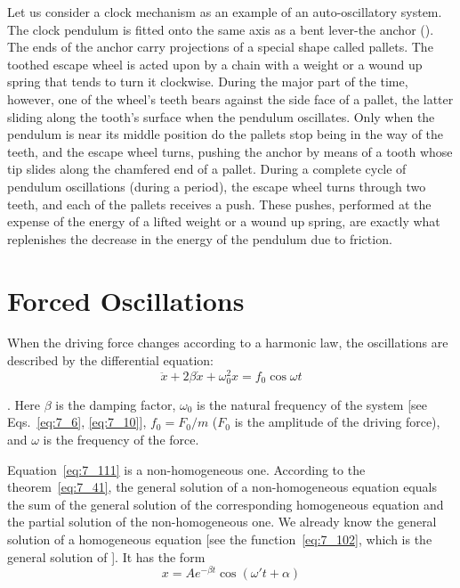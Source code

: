 Let us consider a clock mechanism as an example of an auto-oscillatory system. The clock pendulum is fitted onto the same axis as a bent lever-the anchor (). The ends of the anchor carry projections of a special shape called pallets. The toothed escape wheel is acted upon by a chain with a weight or a wound up spring that tends to turn it clockwise. During the major part of the time, however, one of the wheel's teeth bears against the side face of a pallet, the latter sliding along the tooth's surface when the pendulum oscillates. Only when the pendulum is near its middle position do the pallets stop being in the way of the teeth, and the escape wheel turns, pushing the anchor by means of a tooth whose tip slides along the chamfered end of a pallet. During a complete cycle of pendulum oscillations (during a period), the escape wheel turns through two teeth, and each of the pallets receives a push. These pushes, performed at the expense of the energy of a lifted weight or a wound up spring, are exactly what replenishes the decrease in the energy of the pendulum due to friction.

\section{Forced Oscillations}\label{sec:7_12}

When the driving force changes according to a harmonic law, the oscillations are described by the differential equation:
\begin{equation}\label{eq:7_111}
	\ddot{x} + 2\beta\dot{x} + \omega_0^2 x = f_0\cos\omega t
\end{equation}

. Here $\beta$ is the damping factor, $\omega_0$ is the natural frequency of the system [see Eqs.~\eqref{eq:7_6}, \eqref{eq:7_10}], $f_0=F_0/m$ ($F_0$ is the amplitude of the driving force), and $\omega$ is the frequency of the force.

Equation~\eqref{eq:7_111} is a non-homogeneous one. According to the theorem~\eqref{eq:7_41}, the general solution of a non-homogeneous equation equals the sum of the general solution of the corresponding homogeneous equation and the partial solution of the non-homogeneous one. We already know the general solution of a homogeneous equation [see the function~\eqref{eq:7_102}, which is the general solution of ]. It has the form
\begin{equation}\label{eq:7_112}
	x = A e^{-\beta t} \cos(\omega' t + \alpha)
\end{equation}

